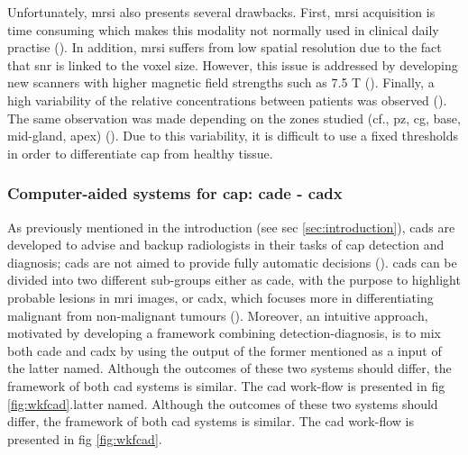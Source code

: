 \begin{enumerate}[leftmargin=*]
Unfortunately, \ac{mrsi} also presents several drawbacks. First, \ac{mrsi} acquisition is time consuming which makes this modality not normally used in clinical daily practise (\cite{Barentsz2012}). In addition, \ac{mrsi} suffers from low spatial resolution due to the fact that \ac{snr} is linked to the voxel size. However, this issue is addressed by developing new scanners with higher magnetic field strengths such as 7.5 T (\cite{Giskeodegard2013}). Finally, a high variability of the relative concentrations between patients was observed (\cite{Choi2007}). The same observation was made depending on the zones studied (cf., \ac{pz}, \ac{cg}, base, mid-gland, apex) (\cite{Walker2010,Lemaitre2011}). Due to this variability, it is difficult to use a fixed thresholds in order to differentiate \ac{cap} from healthy tissue.

\end{enumerate}

\subsubsection{Computer-aided systems for \ac{cap}: \ac{cade} - \ac{cadx}} \label{subsubsec:CAD}

As previously mentioned in the introduction (see \acs{sec} \ref{sec:introduction}), \acp{cad} are developed to advise and backup radiologists in their tasks of \ac{cap} detection and diagnosis; \acp{cad} are not aimed to provide fully automatic decisions (\cite{Giger2008}). \acp{cad} can be divided into two different sub-groups either as \ac{cade}, with the purpose to highlight probable lesions in \ac{mri} images, or \ac{cadx}, which focuses more in differentiating malignant from non-malignant tumours (\cite{Giger2008}). Moreover, an intuitive approach, motivated by developing a framework combining detection-diagnosis, is to mix both \ac{cade} and \ac{cadx} by using the output of the former mentioned as a input of the latter named. Although the outcomes of these two systems should differ, the framework of both \ac{cad} systems is similar. The \ac{cad} work-flow is presented in \acs{fig} \ref{fig:wkfcad}.latter named. Although the outcomes of these two systems should differ, the framework of both \ac{cad} systems is similar. The \ac{cad} work-flow is presented in \acs{fig} \ref{fig:wkfcad}.

